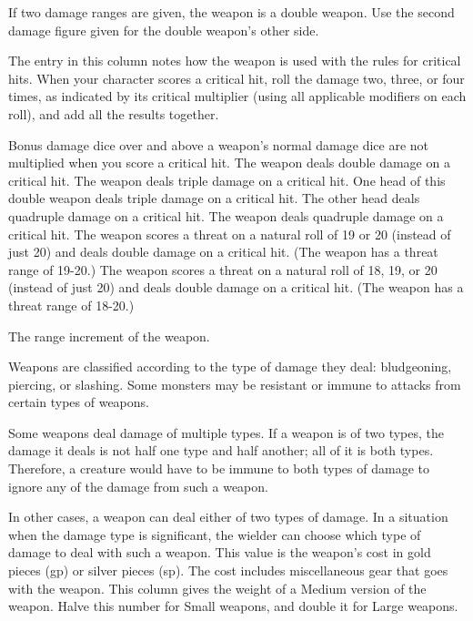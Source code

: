 If two damage ranges are given, the weapon is a double weapon. Use the second damage figure given for the double weapon's other side.

 The entry in this column notes how the weapon is used with the rules for critical hits. When your character scores a critical hit, roll the damage two, three, or four times, as indicated by its critical multiplier (using all applicable modifiers on each roll), and add all the results together.

 Bonus damage dice over and above a weapon's normal damage dice are not multiplied when you score a critical hit.
 The weapon deals double damage on a critical hit.
 The weapon deals triple damage on a critical hit.
 One head of this double weapon deals triple damage on a critical hit. The other head deals quadruple damage on a critical hit.
 The weapon deals quadruple damage on a critical hit.
 The weapon scores a threat on a natural roll of 19 or 20 (instead of just 20) and deals double damage on a critical hit. (The weapon has a threat range of 19-20.)
 The weapon scores a threat on a natural roll of 18, 19, or 20 (instead of just 20) and deals double damage on a critical hit. (The weapon has a threat range of 18-20.)

 The range increment of the weapon.

 Weapons are classified according to the type of damage they deal: bludgeoning, piercing, or slashing. Some monsters may be resistant or immune to attacks from certain types of weapons.

Some weapons deal damage of multiple types. If a weapon is of two types, the damage it deals is not half one type and half another; all of it is both types. Therefore, a creature would have to be immune to both types of damage to ignore any of the damage from such a weapon.

In other cases, a weapon can deal either of two types of damage. In a situation when the damage type is significant, the wielder can choose which type of damage to deal with such a weapon.
 This value is the weapon's cost in gold pieces (gp) or silver pieces (sp). The cost includes miscellaneous gear that goes with the weapon.
 This column gives the weight of a Medium version of
the weapon. Halve this number for Small weapons, and double it for
Large weapons.

